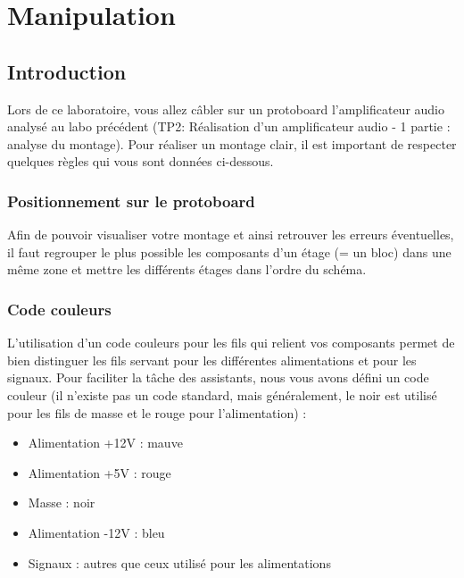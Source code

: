 
\vspace{5cm}
\newpage

\section{Manipulation}
\subsection{Introduction}
Lors de ce laboratoire, vous allez câbler sur un protoboard l’amplificateur audio analysé au labo précédent (TP2: Réalisation d'un amplificateur audio - 1 partie : analyse du montage). Pour réaliser un montage clair, il est important de respecter quelques règles qui vous sont données ci-dessous.
\subsubsection{Positionnement sur le protoboard}
Afin de pouvoir visualiser votre montage et ainsi retrouver les erreurs éventuelles, il faut regrouper le plus possible les composants d’un étage (= un bloc) dans une même zone et mettre les différents étages dans l’ordre du schéma.
\subsubsection{Code couleurs}
L’utilisation d’un code couleurs pour les fils qui relient vos composants permet de bien distinguer les fils servant pour les différentes alimentations et pour les signaux.
Pour faciliter la tâche des assistants, nous vous avons défini un code couleur (il n’existe pas un code standard, mais généralement, le noir est utilisé pour les fils de masse et le rouge pour l’alimentation) :

\begin{itemize}
\item Alimentation +12V : mauve
\item Alimentation +5V : rouge
\item Masse : noir
\item Alimentation -12V : bleu
\item Signaux : autres que ceux utilisé pour les alimentations
\end{itemize}

